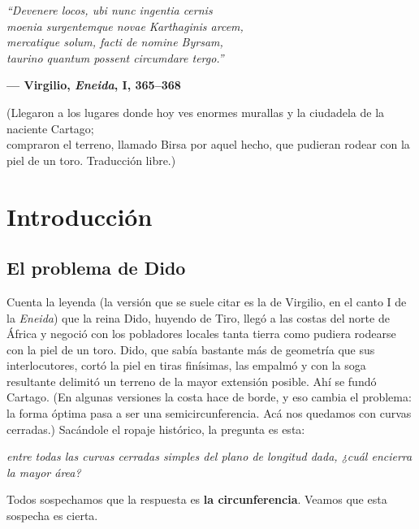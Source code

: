 \documentclass[12pt,a4paper]{article}
\theoremstyle{profesional}
\theoremstyle{definicion-style}
\begin{document}
\thispagestyle{empty}
\vspace*{\fill}

\begin{flushright}
    \textit{``Devenere locos, ubi nunc ingentia cernis}\\
    \textit{moenia surgentemque novae Karthaginis arcem,}\\
    \textit{mercatique solum, facti de nomine Byrsam,}\\
    \textit{taurino quantum possent circumdare tergo.''}

    \vspace{0.5cm}
    \textbf{--- Virgilio, \textit{Eneida}, I, 365--368}

    \vspace{0.8cm}
    {\footnotesize \textcolor{mediumgray}{(Llegaron a los lugares donde hoy ves enormes murallas y la ciudadela de la naciente Cartago;\\
            compraron el terreno, llamado Birsa por aquel hecho, que pudieran rodear con la piel de un toro. Traducción libre.)}}
\end{flushright}

\vspace*{\fill}

\newpage

\tableofcontents
\thispagestyle{empty}
\newpage

\section{Introducción}

\subsection{El problema de Dido}

Cuenta la leyenda (la versión que se suele citar es la de Virgilio, en el canto I de la \textit{Eneida}) que la reina Dido, huyendo de Tiro, llegó a las costas del norte de África y negoció con los pobladores locales
tanta tierra como pudiera rodearse con la piel de un toro. Dido, que sabía bastante más de geometría que sus interlocutores, cortó la piel en tiras finísimas, las empalmó y con la soga resultante delimitó un
terreno de la mayor extensión posible. Ahí se fundó Cartago. (En algunas versiones la costa hace de borde, y eso cambia el problema: la forma óptima pasa a ser una semicircunferencia.
Acá nos quedamos con curvas cerradas.) Sacándole el ropaje histórico, la pregunta es esta:
\begin{center}
    \textit{entre todas las curvas cerradas simples del plano de longitud dada, ¿cuál encierra la mayor área?}
\end{center}
Todos sospechamos que la respuesta es \textbf{la circunferencia}. Veamos que esta sospecha es cierta.
\end{document}
